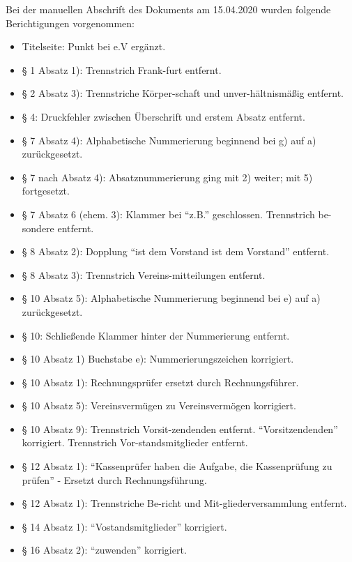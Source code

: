 \documentclass[11pt]{article}
\begin{document}
\newpage
\begin{appendix}
Bei der manuellen Abschrift des Dokuments am 15.04.2020 wurden folgende Berichtigungen vorgenommen:
\begin{itemize}
	\item Titelseite: Punkt bei e.V ergänzt.
	\item § 1 Absatz 1): Trennstrich Frank-furt entfernt.
	\item § 2 Absatz 3): Trennstriche Körper-schaft und unver-hältnismäßig entfernt.
	\item § 4: Druckfehler zwischen Überschrift und erstem Absatz entfernt.
	\item § 7 Absatz 4): Alphabetische Nummerierung beginnend bei g) auf a) zurückgesetzt.
	\item § 7 nach Absatz 4): Absatznummerierung ging mit 2) weiter; mit 5) fortgesetzt.
	\item § 7 Absatz 6 (ehem. 3): Klammer bei "`z.B."' geschlossen. Trennstrich be-sondere entfernt.
	\item § 8 Absatz 2): Dopplung "`ist dem Vorstand ist dem Vorstand"' entfernt.
	\item § 8 Absatz 3): Trennstrich Vereins-mitteilungen entfernt.
	\item § 10 Absatz 5): Alphabetische Nummerierung beginnend bei e) auf a) zurückgesetzt.
	\item § 10: Schließende Klammer hinter der Nummerierung entfernt.
	\item § 10 Absatz 1) Buchstabe e): Nummerierungszeichen korrigiert.
	\item § 10 Absatz 1): Rechnungsprüfer ersetzt durch Rechnungsführer.
	\item § 10 Absatz 5): Vereinsvermügen zu Vereinsvermögen korrigiert.
	\item § 10 Absatz 9): Trennstrich Vorsit-zendenden entfernt. "`Vorsitzendenden"' korrigiert. Trennstrich Vor-standsmitglieder entfernt.
	\item § 12 Absatz 1): "`Kassenprüfer haben die Aufgabe, die Kassenprüfung zu prüfen"' - Ersetzt durch Rechnungsführung.
	\item § 12 Absatz 1): Trennstriche Be-richt und Mit-gliederversammlung entfernt.
	\item § 14 Absatz 1): "`Vostandsmitglieder"' korrigiert.
	\item § 16 Absatz 2): "`zuwenden"' korrigiert.
\end{itemize}


\end{appendix}
\end{document}
